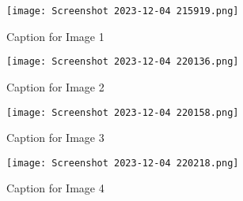 \documentclass{article}
\begin{document}
\begin{figure}[h!]
  \centering
  \texttt{[image: Screenshot 2023-12-04 215919.png]} %
  \caption{Caption for Image 1}
\end{figure}

\begin{figure}[h!]
  \centering
  \texttt{[image: Screenshot 2023-12-04 220136.png]} %
  \caption{Caption for Image 2}
\end{figure}

\begin{figure}[h!]
  \centering
  \texttt{[image: Screenshot 2023-12-04 220158.png]} %
  \caption{Caption for Image 3}
\end{figure}

\begin{figure}[h!]
  \centering
  \texttt{[image: Screenshot 2023-12-04 220218.png]} %
  \caption{Caption for Image 4}
\end{figure}
\end{document}

